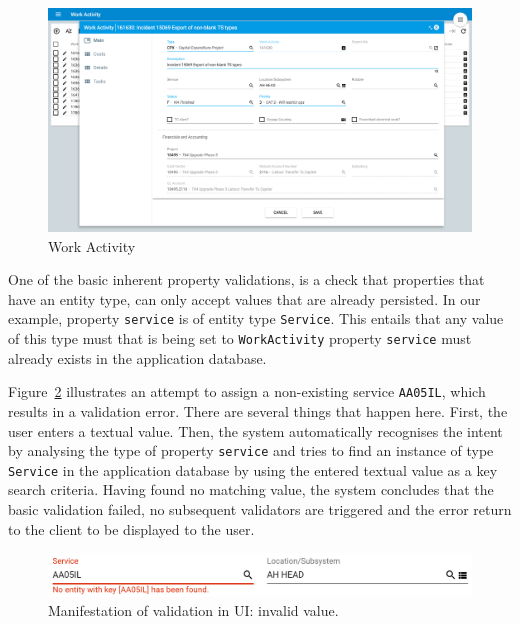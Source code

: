\documentclass[a4paper,12pt,oneside,openright,final]{memoir} %
\begin{document}
	\begin{figure}[!h]
  		\centering
        \includegraphics[width=1.0\textwidth]{images/01-wa-master.png}  
        \caption{Work Activity}
        \label{fig:wa}
  	\end{figure}

	One of the basic inherent property validations, is a check that properties that have an entity type, can only accept values that are already persisted.
	In our example, property \texttt{service} is of entity type \texttt{Service}.
	This entails that any value of this type must that is being set to \texttt{WorkActivity} property \texttt{service} must already exists in the application database.
	
	Figure~\ref{fig:non-existing-service} illustrates an attempt to assign a non-existing service \texttt{AA05IL}, which results in a validation error.
	There are several things that happen here.
	First, the user enters a textual value.
	Then, the system automatically recognises the intent by analysing the type of property \texttt{service} and tries to find an instance of type \texttt{Service} in the application database by using the entered textual value as a key search criteria.
	Having found no matching value, the system concludes that the basic validation failed, no subsequent validators are triggered and the error return to the client to be displayed to the user.

	\begin{figure}[!h]
  		\centering
     	\includegraphics[width=1.0\textwidth]{images/02-wa-non-existing-service.png}  
  	  	\caption{Manifestation of validation in UI: invalid value.}
   		\label{fig:non-existing-service}
  	\end{figure}
\end{document}
